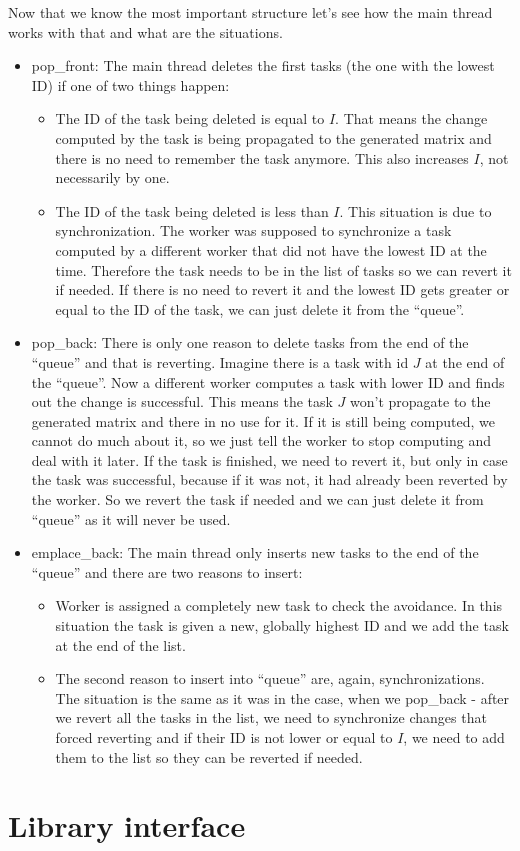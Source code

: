 Now that we know the most important structure let's see how the main thread works with that and what are the situations.
\begin{itemize}
\item pop\_front: The main thread deletes the first tasks (the one with the lowest ID) if one of two things happen:
\begin{itemize}
\item The ID of the task being deleted is equal to $I$. That means the change computed by the task is being propagated to the generated matrix and there is no need to remember the task anymore. This also increases $I$, not necessarily by one.
\item The ID of the task being deleted is less than $I$. This situation is due to synchronization. The worker was supposed to synchronize a task computed by a different worker that did not have the lowest ID at the time. Therefore the task needs to be in the list of tasks so we can revert it if needed. If there is no need to revert it and the lowest ID gets greater or equal to the ID of the task, we can just delete it from the ``queue''.
\end{itemize}
\item pop\_back: There is only one reason to delete tasks from the end of the ``queue'' and that is reverting. Imagine there is a task with id $J$ at the end of the ``queue''. Now a different worker computes a task with lower ID and finds out the change is successful. This means the task $J$ won't propagate to the generated matrix and there in no use for it. If it is still being computed, we cannot do much about it, so we just tell the worker to stop computing and deal with it later. If the task is finished, we need to revert it, but only in case the task was successful, because if it was not, it had already been reverted by the worker. So we revert the task if needed and we can just delete it from ``queue'' as it will never be used.
\item emplace\_back: The main thread only inserts new tasks to the end of the ``queue'' and there are two reasons to insert:
\begin{itemize}
\item Worker is assigned a completely new task to check the avoidance. In this situation the task is given a new, globally highest ID and we add the task at the end of the list.
\item The second reason to insert into ``queue'' are, again, synchronizations. The situation is the same as it was in the case, when we pop\_back - after we revert all the tasks in the list, we need to synchronize changes that forced reverting and if their ID is not lower or equal to $I$, we need to add them to the list so they can be reverted if needed.
\end{itemize}
\end{itemize}

\section{Library interface}
